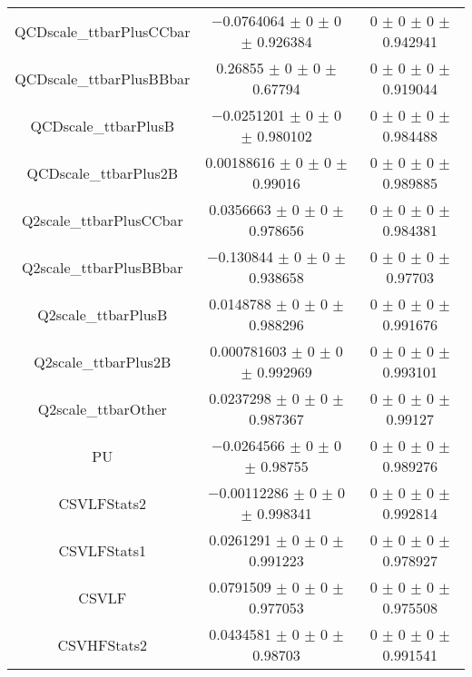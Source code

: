 \begin{table}
\begin{tabular}{ccc}
QCDscale\_ttbarPlusCCbar 	& \num{-0.0764064} $\pm$ \num{0} $\pm$ \num{0} $\pm$ \num{0.926384} 	& \num{0} $\pm$ \num{0} $\pm$ \num{0} $\pm$ \num{0.942941}\\
QCDscale\_ttbarPlusBBbar 	& \num{0.26855} $\pm$ \num{0} $\pm$ \num{0} $\pm$ \num{0.67794} 	& \num{0} $\pm$ \num{0} $\pm$ \num{0} $\pm$ \num{0.919044}\\
QCDscale\_ttbarPlusB 	& \num{-0.0251201} $\pm$ \num{0} $\pm$ \num{0} $\pm$ \num{0.980102} 	& \num{0} $\pm$ \num{0} $\pm$ \num{0} $\pm$ \num{0.984488}\\
QCDscale\_ttbarPlus2B 	& \num{0.00188616} $\pm$ \num{0} $\pm$ \num{0} $\pm$ \num{0.99016} 	& \num{0} $\pm$ \num{0} $\pm$ \num{0} $\pm$ \num{0.989885}\\
Q2scale\_ttbarPlusCCbar 	& \num{0.0356663} $\pm$ \num{0} $\pm$ \num{0} $\pm$ \num{0.978656} 	& \num{0} $\pm$ \num{0} $\pm$ \num{0} $\pm$ \num{0.984381}\\
Q2scale\_ttbarPlusBBbar 	& \num{-0.130844} $\pm$ \num{0} $\pm$ \num{0} $\pm$ \num{0.938658} 	& \num{0} $\pm$ \num{0} $\pm$ \num{0} $\pm$ \num{0.97703}\\
Q2scale\_ttbarPlusB 	& \num{0.0148788} $\pm$ \num{0} $\pm$ \num{0} $\pm$ \num{0.988296} 	& \num{0} $\pm$ \num{0} $\pm$ \num{0} $\pm$ \num{0.991676}\\
Q2scale\_ttbarPlus2B 	& \num{0.000781603} $\pm$ \num{0} $\pm$ \num{0} $\pm$ \num{0.992969} 	& \num{0} $\pm$ \num{0} $\pm$ \num{0} $\pm$ \num{0.993101}\\
Q2scale\_ttbarOther 	& \num{0.0237298} $\pm$ \num{0} $\pm$ \num{0} $\pm$ \num{0.987367} 	& \num{0} $\pm$ \num{0} $\pm$ \num{0} $\pm$ \num{0.99127}\\
PU 	& \num{-0.0264566} $\pm$ \num{0} $\pm$ \num{0} $\pm$ \num{0.98755} 	& \num{0} $\pm$ \num{0} $\pm$ \num{0} $\pm$ \num{0.989276}\\
CSVLFStats2 	& \num{-0.00112286} $\pm$ \num{0} $\pm$ \num{0} $\pm$ \num{0.998341} 	& \num{0} $\pm$ \num{0} $\pm$ \num{0} $\pm$ \num{0.992814}\\
CSVLFStats1 	& \num{0.0261291} $\pm$ \num{0} $\pm$ \num{0} $\pm$ \num{0.991223} 	& \num{0} $\pm$ \num{0} $\pm$ \num{0} $\pm$ \num{0.978927}\\
CSVLF 	& \num{0.0791509} $\pm$ \num{0} $\pm$ \num{0} $\pm$ \num{0.977053} 	& \num{0} $\pm$ \num{0} $\pm$ \num{0} $\pm$ \num{0.975508}\\
CSVHFStats2 	& \num{0.0434581} $\pm$ \num{0} $\pm$ \num{0} $\pm$ \num{0.98703} 	& \num{0} $\pm$ \num{0} $\pm$ \num{0} $\pm$ \num{0.991541}\\

\end{tabular}
\end{table}
